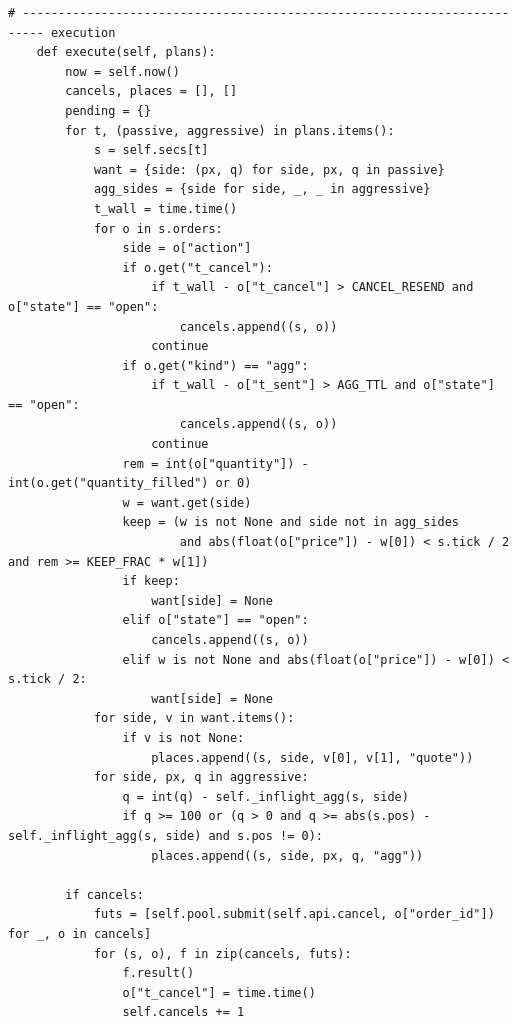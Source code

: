\begin{lstlisting}[style=algocode]
    # ------------------------------------------------------------------------- execution
    def execute(self, plans):
        now = self.now()
        cancels, places = [], []
        pending = {}
        for t, (passive, aggressive) in plans.items():
            s = self.secs[t]
            want = {side: (px, q) for side, px, q in passive}
            agg_sides = {side for side, _, _ in aggressive}
            t_wall = time.time()
            for o in s.orders:
                side = o["action"]
                if o.get("t_cancel"):
                    if t_wall - o["t_cancel"] > CANCEL_RESEND and o["state"] == "open":
                        cancels.append((s, o))
                    continue
                if o.get("kind") == "agg":
                    if t_wall - o["t_sent"] > AGG_TTL and o["state"] == "open":
                        cancels.append((s, o))
                    continue
                rem = int(o["quantity"]) - int(o.get("quantity_filled") or 0)
                w = want.get(side)
                keep = (w is not None and side not in agg_sides
                        and abs(float(o["price"]) - w[0]) < s.tick / 2 and rem >= KEEP_FRAC * w[1])
                if keep:
                    want[side] = None
                elif o["state"] == "open":
                    cancels.append((s, o))
                elif w is not None and abs(float(o["price"]) - w[0]) < s.tick / 2:
                    want[side] = None
            for side, v in want.items():
                if v is not None:
                    places.append((s, side, v[0], v[1], "quote"))
            for side, px, q in aggressive:
                q = int(q) - self._inflight_agg(s, side)
                if q >= 100 or (q > 0 and q >= abs(s.pos) - self._inflight_agg(s, side) and s.pos != 0):
                    places.append((s, side, px, q, "agg"))

        if cancels:
            futs = [self.pool.submit(self.api.cancel, o["order_id"]) for _, o in cancels]
            for (s, o), f in zip(cancels, futs):
                f.result()
                o["t_cancel"] = time.time()
                self.cancels += 1


\end{lstlisting}

